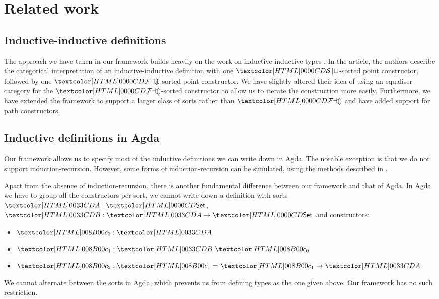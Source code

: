 \section{Related work}
\label{describing-related-work}

\subsection{Inductive-inductive definitions}

The approach we have taken in our framework builds heavily on the work
on inductive-inductive types \cite{Altenkirch2011}. In the article,
the authors describe the categorical interpretation of an
inductive-inductive definition with one $\SET$-sorted point
constructor, followed by one $\FAM$-sorted point constructor. We have
slightly altered their idea of using an equaliser category for the
$\FAM$-sorted constructor to allow us to iterate the construction more
easily. Furthermore, we have extended the framework to support a
larger class of sorts rather than $\FAM$ and have added support for
path constructors.

\subsection{Inductive definitions in Agda}
Our framework allows us to specify most of the inductive definitions
we can write down in Agda. The notable exception is that we do not
support induction-recursion. However, some forms of
induction-recursion can be simulated, using the methods described in
\cite{Hancock2013}.

Apart from the absence of induction-recursion, there is another
fundamental difference between our framework and that of Agda. In Agda
we have to group all the constructors per sort, \ie we cannot write
down a definition with sorts $\Aty : \Set$, $\Bty : \Aty \to \Set$ and
constructors:
%
\begin{itemize}
\item $\Aco : \Aty$
\item $\Bci : \Bty\ \Aco$
\item $\Acii : \Bci = \Bci \to \Aty$
\end{itemize}
%
We cannot alternate between the sorts in Agda, which prevents us from
defining types as the one given above. Our framework has no such
restriction.

